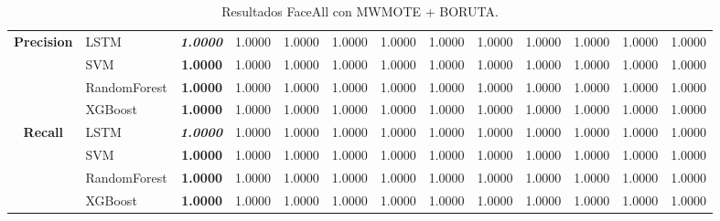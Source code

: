 \begin{table}[H]
\begin{adjustbox}{max width=12cm}
\begin{tabular}{|c|l|r|r|r|r|r|r|r|r|r|r|r|}
			\textbf{Precision} & LSTM &  \textit{\textbf{1.0000}} &  1.0000 &  1.0000 &  1.0000 &  1.0000 &  1.0000 &  1.0000 &  1.0000 &  1.0000 &  1.0000 &  1.0000 \\
			& SVM &  \textbf{1.0000} &  1.0000 &  1.0000 &  1.0000 &  1.0000 &  1.0000 &  1.0000 &  1.0000 &  1.0000 &  1.0000 &  1.0000 \\
			& RandomForest &  \textbf{1.0000} &  1.0000 &  1.0000 &  1.0000 &  1.0000 &  1.0000 &  1.0000 &  1.0000 &  1.0000 &  1.0000 &  1.0000 \\
			& XGBoost &  \textbf{1.0000} &  1.0000 &  1.0000 &  1.0000 &  1.0000 &  1.0000 &  1.0000 &  1.0000 &  1.0000 &  1.0000 &  1.0000 \\
			\hline
			\textbf{Recall} & LSTM &  \textit{\textbf{1.0000}} &  1.0000 &  1.0000 &  1.0000 &  1.0000 &  1.0000 &  1.0000 &  1.0000 &  1.0000 &  1.0000 &  1.0000 \\
			& SVM &  \textbf{1.0000} &  1.0000 &  1.0000 &  1.0000 &  1.0000 &  1.0000 &  1.0000 &  1.0000 &  1.0000 &  1.0000 &  1.0000 \\
			& RandomForest &  \textbf{1.0000} &  1.0000 &  1.0000 &  1.0000 &  1.0000 &  1.0000 &  1.0000 &  1.0000 &  1.0000 &  1.0000 &  1.0000 \\
			& XGBoost &  \textbf{1.0000} &  1.0000 &  1.0000 &  1.0000 &  1.0000 &  1.0000 &  1.0000 &  1.0000 &  1.0000 &  1.0000 &  1.0000 \\
			\hline
			
		\end{tabular}
	\end{adjustbox}	
	\caption{Resultados FaceAll con MWMOTE + BORUTA.}
	\label{tab:faceAllMWMOTEBORUTA}
\end{table}


